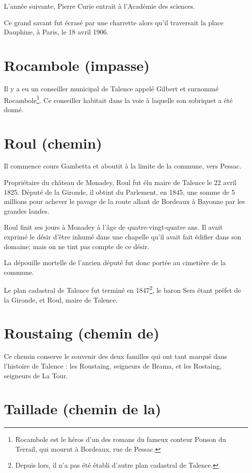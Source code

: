 \documentclass[a4paper,11pt]{book}
\begin{document}
L'année suivante, Pierre Curie entrait à l'Académie des sciences.

Ce grand savant fut écrasé par une charrette alors qu'il traversait la place Dauphine, à Paris, le 18 avril 1906.

\section{Rocambole (impasse)}

Il y a eu un conseiller municipal de Talence appelé Gilbert et surnommé Rocambole\footnote{Rocambole est le héros d'un des romans du fameux conteur Ponson du Terrail, qui mourut à Bordeaux, rue de Pessac.}. Ce conseiller habitait dans la voie à laquelle son sobriquet a été donné.

\section{Roul (chemin)}

Il commence cours Gambetta et aboutit à la limite de la commune, vers Pessac.

Propriétaire du château de Monadey, Roul fut élu maire de Talence le 22 avril 1825. Député de la Gironde, il obtint du Parlement, en 1845, une somme de 5 millions pour achever le pavage de la route allant de Bordeaux à Bayonne par les grandes landes.

Roul finit ses jours à Monadey à l'âge de quatre-vingt-quatre ans. Il avait exprimé le désir d'être inhumé dans une chapelle qu'il avait fait édifier dans son domaine; mais on ne tint pas compte de ce désir.

La dépouille mortelle de l'ancien député fut donc portée au cimetière de la commune.

Le plan cadastral de Talence fut terminé en 1847\footnote{Depuis lors, il n'a pas été établi d'autre plan cadastral de Talence.}, le baron Sers étant préfet de la Gironde, et Roul, maire de Talence.

\section{Roustaing (chemin de)}

Ce chemin conserve le souvenir des deux familles qui ont tant marqué dans l'histoire de Talence : les Roustaing, seigneurs de Brama, et les Rostaing, seigneurs de La Tour.

\section{Taillade (chemin de la)}
\end{document}
